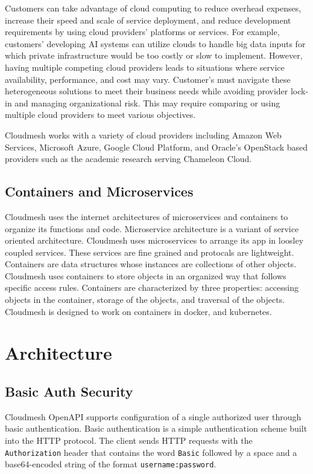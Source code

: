 Customers can take advantage of cloud computing to reduce overhead
expenses, increase their speed and scale of service deployment, and
reduce development requirements by using cloud providers' platforms or
services. For example, customers' developing AI systems can utilize
clouds to handle big data inputs for which private infrastructure would
be too costly or slow to implement. However, having multiple competing
cloud providers leads to situations where service availability,
performance, and cost may vary. Customer's must navigate these
heterogeneous solutions to meet their business needs while avoiding
provider lock-in and managing organizational risk. This may require
comparing or using multiple cloud providers to meet various objectives.

Cloudmesh works with a variety of cloud providers including Amazon Web
Services, Microsoft Azure, Google Cloud Platform, and Oracle's OpenStack
based providers such as the academic research serving Chameleon Cloud.

\subsection{Containers and
  Microservices}\label{containers-and-microservices}

Cloudmesh uses the internet architectures of microservices and
containers to organize its functions and code. Microservice architecture
is a variant of service oriented architecture. Cloudmesh uses
microservices to arrange its app in loosley coupled services. These
services are fine grained and protocals are lightweight. Containers are
data structures whose instances are collections of other objects.
Cloudmesh uses containers to store objects in an organized way that
follows specific access rules. Containers are characterized by three
properties: accessing objects in the container, storage of the objects,
and traversal of the objects. Cloudmesh is designed to work on
containers in docker, and kubernetes.

\section{Architecture}\label{architecture}

\subsection{Basic Auth Security}\label{basic-auth-security}

Cloudmesh OpenAPI supports configuration of a single authorized user
through basic authentication. Basic authentication is a simple
authentication scheme built into the HTTP protocol. The client sends
HTTP requests with the \verb|Authorization| header that contains the
word \verb|Basic| followed by a space and a base64-encoded string of
the format \verb|username:password|.


